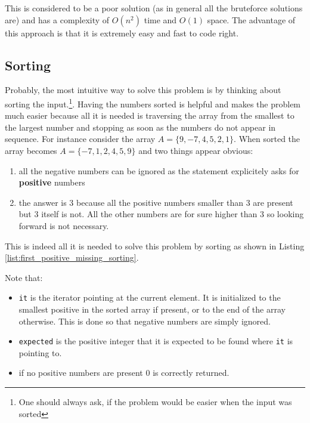 

This is considered to be a poor solution (as in general all the bruteforce solutions are) and has a complexity of $O(n^2)$ time and $O(1)$ space. The advantage of this approach is that it is extremely easy and fast to code right. 

\subsection{Sorting}
\label{first_positive_missing:sec:sorting}
Probably, the most intuitive way to solve this problem is by thinking about sorting the input.\footnote{One should always ask, if the problem would be easier when the input was sorted}. Having the numbers sorted is helpful and makes the problem much easier because all it is needed is traversing the array from the smallest to the largest number and stopping as soon as the numbers do not appear in sequence. 
For instance consider the array $A=\{ 9,-7,4,5,2,1\}$. When sorted the array becomes $A=\{ -7,1,2,4,5,9\}$ and two things appear obvious:

\begin{enumerate}
	\item all the negative numbers can be ignored as the statement explicitely asks for \textbf{positive} numbers
	\item the answer is $3$ because all the positive numbers smaller than $3$ are present but $3$ itself is not. All the other numbers are for sure higher than $3$ so looking forward is not necessary.
\end{enumerate}

This is indeed all it is needed to solve this problem by sorting as shown in Listing \ref{list:first_positive_missing_sorting}.



Note that:
\begin{itemize}
	\item[] \texttt{it} is the iterator pointing at the current element. It is initialized to the smallest positive in the sorted array if present, or to the end of the array otherwise. This is done so that negative numbers are simply ignored.
	\item[] \texttt{expected} is the positive integer that it is expected to be found where \texttt{it} is pointing to.
	\item[] if no positive numbers are present $0$ is correctly returned.
\end{itemize}

